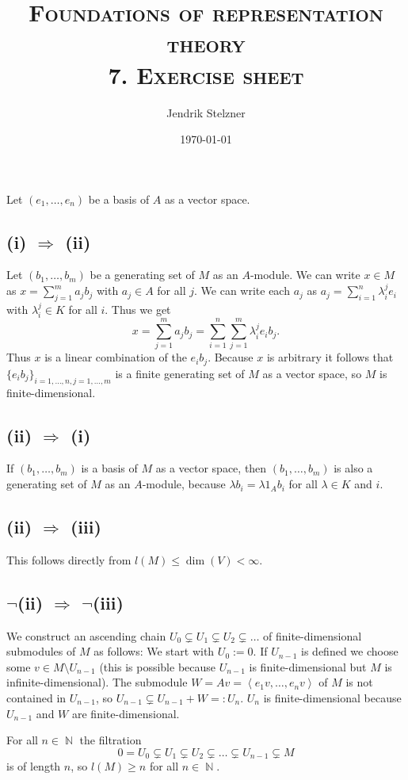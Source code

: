 \documentclass[a4paper,10pt]{article}
\title{\textsc{Foundations of representation theory \\ \Large 7. Exercise sheet}}
\author{Jendrik Stelzner}
\date{\today}
\theoremstyle{definition}
\newcommand{\N}{\operatorname{\mathbb{N}}}
\newcommand{\gen}[1]{\left\langle#1\right\rangle}
\begin{document}
\maketitle




\addtocounter{section}{1}
\section{}
Let $(e_1, \ldots, e_n)$ be a basis of $A$ as a vector space.


\subsection*{(i) $\Rightarrow$ (ii)}
Let $(b_1, \ldots, b_m)$ be a generating set of $M$ as an $A$-module. We can write $x \in M$ as $x = \sum_{j=1}^m a_j b_j$ with $a_j \in A$ for all $j$. We can write each $a_j$ as $a_j = \sum_{i=1}^n \lambda^j_i e_i$ with $\lambda^j_i \in K$ for all $i$. Thus we get
\[
 x = \sum_{j=1}^m a_j b_j =  \sum_{i=1}^n \sum_{j=1}^m \lambda^j_i e_i b_j.
\]
Thus $x$ is a linear combination of the $e_i b_j$. Because $x$ is arbitrary it follows that $\{e_i b_j\}_{i=1,\ldots,n, j=1,\ldots,m}$ is a finite generating set of $M$ as a vector space, so $M$ is finite-dimensional.


\subsection*{(ii) $\Rightarrow$ (i)}
If $(b_1, \ldots, b_m)$ is a basis of $M$ as a vector space, then $(b_1, \ldots, b_m)$ is also a generating set of $M$ as an $A$-module, because $\lambda b_i = \lambda 1_A b_i$ for all $\lambda \in K$ and $i$.


\subsection*{(ii) $\Rightarrow$ (iii)}
This follows directly from $l(M) \leq \dim(V) < \infty$.


\subsection*{$\neg$(ii) $\Rightarrow$ $\neg$(iii)}
We construct an ascending chain $U_0 \subsetneq U_1 \subsetneq U_2 \subsetneq \ldots$ of finite-dimensional submodules of $M$ as follows: We start with $U_0 := 0$. If $U_{n-1}$ is defined we choose some $v \in M \setminus U_{n-1}$ (this is possible because $U_{n-1}$ is finite-dimensional but $M$ is infinite-dimensional). The submodule $W = Av = \gen{e_1 v, \ldots, e_n v}$ of $M$ is not contained in $U_{n-1}$, so $U_{n-1} \subsetneq U_{n-1} + W =: U_n$. $U_n$ is finite-dimensional because $U_{n-1}$ and $W$ are finite-dimensional.

For all $n \in \N$ the filtration
\[
 0 = U_0 \subsetneq U_1 \subsetneq U_2 \subsetneq \ldots \subsetneq U_{n-1} \subsetneq M
\]
is of length $n$, so $l(M) \geq n$ for all $n \in \N$.
\end{document}
